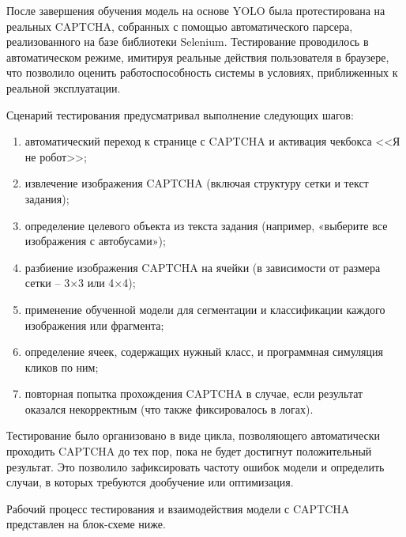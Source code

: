 После завершения обучения модель на основе YOLO была протестирована на реальных 
CAPTCHA, собранных с помощью автоматического парсера, реализованного на базе 
библиотеки Selenium. Тестирование проводилось в автоматическом режиме, имитируя 
реальные действия пользователя в браузере, что позволило оценить 
работоспособность системы в условиях, приближенных к реальной эксплуатации.

Сценарий тестирования предусматривал выполнение следующих шагов:

\begin{enumerate}
    \item автоматический переход к странице с CAPTCHA и активация чекбокса <<Я не 
    робот>>;
    \item извлечение изображения CAPTCHA (включая структуру сетки и текст 
    задания);
    \item определение целевого объекта из текста задания (например, «выберите все 
    изображения с автобусами»);
    \item разбиение изображения CAPTCHA на ячейки (в зависимости от размера сетки 
    -- 3×3 или 4×4);
    \item применение обученной модели для сегментации и классификации каждого 
    изображения или фрагмента;
    \item определение ячеек, содержащих нужный класс, и программная симуляция 
    кликов по ним;
    \item повторная попытка прохождения CAPTCHA в случае, если результат оказался 
    некорректным (что также фиксировалось в логах).
\end{enumerate}

Тестирование было организовано в виде цикла, позволяющего автоматически проходить 
CAPTCHA до тех пор, пока не будет достигнут положительный результат. Это 
позволило зафиксировать частоту ошибок модели и определить случаи, в которых 
требуются дообучение или оптимизация.

Рабочий процесс тестирования и взаимодействия модели с CAPTCHA представлен на 
блок-схеме ниже.


